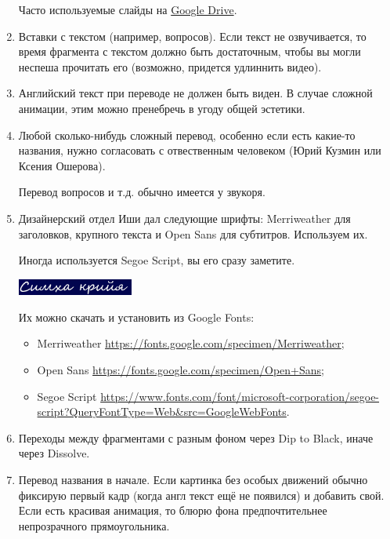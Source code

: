\documentclass[
a4paper, %
12pt, %
article,
onecolumn, %
openany, %
]{memoir}
\begin{document}
\begin{enumerate}
 Часто используемые слайды на 
\href{https://drive.google.com/drive/folders/1O54z3DtKpl90ut0Aa8wYkEEP37e00zPY?usp=sharing}{Google Drive}.

\item Вставки с текстом (например, вопросов). Если текст не озвучивается, то время фрагмента с текстом должно быть достаточным, чтобы вы могли неспеша прочитать его (возможно, придется удлиннить видео).

\item Английский текст при переводе не должен быть виден. В случае сложной анимации, этим можно пренебречь в угоду общей эстетики.

\item Любой сколько-нибудь сложный перевод, особенно если есть какие-то названия, нужно согласовать с отвественным человеком (Юрий Кузмин или Ксения Ошерова).

	Перевод вопросов и т.д. обычно имеется у звукоря.

\item Дизайнерский отдел Иши дал следующие шрифты: Merriweather для заголовков, крупного текста и Open Sans для субтитров. Используем их.

    Иногда используется Segoe Script, вы его сразу заметите.

 \includegraphics[width=0.3\textwidth]{segoeScript}

    Их можно скачать и установить из Google Fonts:
    \begin{itemize}
        \item  Merriweather \href{https://fonts.google.com/specimen/Merriweather}{\small https://fonts.google.com/specimen/Merriweather};
        \item Open Sans \href{https://fonts.google.com/specimen/Open+Sans}{\small https://fonts.google.com/specimen/Open+Sans};
    \item Segoe Script \href{https://www.fonts.com/font/microsoft-corporation/segoe-script?QueryFontType=Web&src=GoogleWebFonts}{\small https://www.fonts.com/font/microsoft-corporation/segoe-script?QueryFontType=Web\&src=GoogleWebFonts}.
      \end{itemize}


\item Переходы между фрагментами с разным фоном через Dip to Black, иначе через Dissolve.

\item Перевод названия в начале. Если картинка без особых движений обычно фиксирую первый кадр (когда англ текст ещё не появился) и добавить свой. 
	Если есть красивая анимация, то блюрю фона предпочтительнее непрозрачного прямоугольника.


\end{enumerate}
\end{document}
